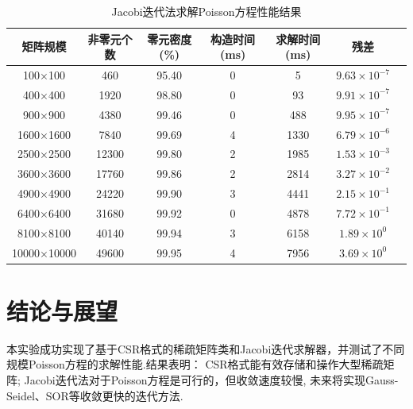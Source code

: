 \documentclass[12pt,a4paper]{article}
\begin{document}
\begin{table}[H]
\centering
\caption{Jacobi迭代法求解Poisson方程性能结果}
\label{tab:results}
\begin{tabular}{ccccccc}
\toprule
 矩阵规模 & 非零元个数 & 零元密度(\%) & 构造时间(ms) & 求解时间(ms) & 残差 \\
\midrule
 100×100 & 460 & 95.40 & 0 & 5 & $9.63 \times 10^{-7}$ \\
 400×400 & 1920 & 98.80 & 0 & 93 & $9.91 \times 10^{-7}$ \\
 900×900 & 4380 & 99.46 & 0 & 488 & $9.95 \times 10^{-7}$ \\
 1600×1600 & 7840 & 99.69 & 4 & 1330 & $6.79 \times 10^{-6}$ \\
 2500×2500 & 12300 & 99.80 & 2 & 1985 & $1.53 \times 10^{-3}$ \\
 3600×3600 & 17760 & 99.86 & 2 & 2814 & $3.27 \times 10^{-2}$ \\
4900×4900 & 24220 & 99.90 & 3 & 4441 & $2.15 \times 10^{-1}$ \\
6400×6400 & 31680 & 99.92 & 0 & 4878 & $7.72 \times 10^{-1}$ \\
 8100×8100 & 40140 & 99.94 & 3 & 6158 & $1.89 \times 10^{0}$ \\
 10000×10000 & 49600 & 99.95 & 4 & 7956 & $3.69 \times 10^{0}$ \\
\bottomrule
\end{tabular}
\end{table}

\section{结论与展望}
本实验成功实现了基于CSR格式的稀疏矩阵类和Jacobi迭代求解器，并测试了不同规模Poisson方程的求解性能.结果表明：
CSR格式能有效存储和操作大型稀疏矩阵; Jacobi迭代法对于Poisson方程是可行的，但收敛速度较慢, 未来将实现Gauss-Seidel、SOR等收敛更快的迭代方法.
\end{document}
